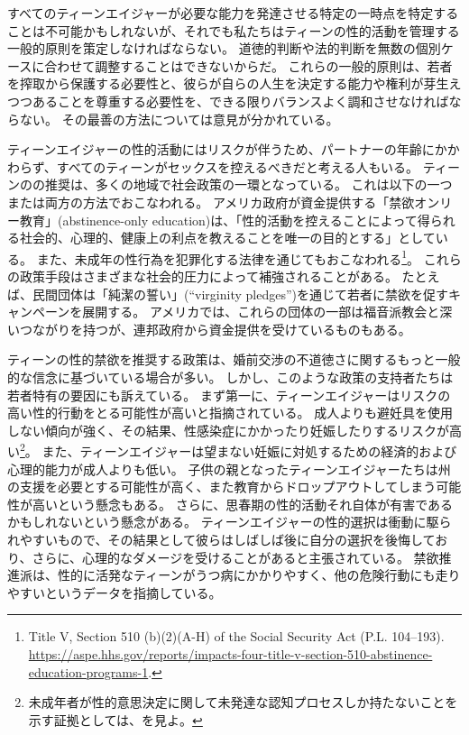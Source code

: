 \documentclass[paper=a4,book,openany]{jlreq}
\begin{document}
すべてのティーンエイジャーが必要な能力を発達させる特定の一時点を特定することは不可能かもしれないが、それでも私たちはティーンの性的活動を管理する一般的原則を策定しなければならない。
道徳的判断や法的判断を無数の個別ケースに合わせて調整することはできないからだ。
これらの一般的原則は、若者を搾取から保護する必要性と、彼らが自らの人生を決定する能力や権利が芽生えつつあることを尊重する必要性を、できる限りバランスよく調和させなければならない。
その最善の方法については意見が分かれている。

ティーンエイジャーの性的活動にはリスクが伴うため、パートナーの年齢にかかわらず、すべてのティーンがセックスを控えるべきだと考える人もいる。
ティーンのの推奨は、多くの地域で社会政策の一環となっている。
これは以下の一つまたは両方の方法でおこなわれる。
アメリカ政府が資金提供する「禁欲オンリー教育」(abstinence-only education)は、「性的活動を控えることによって得られる社会的、心理的、健康上の利点を教えることを唯一の目的とする」としている。
また、未成年の性行為を犯罪化する法律を通じてもおこなわれる\footnote{Title V, Section 510 (b)(2)(A-H) of the Social Security Act (P.L. 104--193). \url{https://aspe.hhs.gov/reports/impacts-four-title-v-section-510-abstinence-education-programs-1}.}。
これらの政策手段はさまざまな社会的圧力によって補強されることがある。
たとえば、民間団体は「純潔の誓い」(``virginity pledges'')を通じて若者に禁欲を促すキャンペーンを展開する。
アメリカでは、これらの団体の一部は福音派教会と深いつながりを持つが、連邦政府から資金提供を受けているものもある。

ティーンの性的禁欲を推奨する政策は、婚前交渉の不道徳さに関するもっと一般的な信念に基づいている場合が多い。
しかし、このような政策の支持者たちは若者特有の要因にも訴えている。
まず第一に、ティーンエイジャーはリスクの高い性的行動をとる可能性が高いと指摘されている。
成人よりも避妊具を使用しない傾向が強く、その結果、性感染症にかかったり妊娠したりするリスクが高い\footnote{未成年者が性的意思決定に関して未発達な認知プロセスしか持たないことを示す証拠としては、\citet{drobac14:_neurob_decis_makin_high_risk}を見よ。}。
また、ティーンエイジャーは望まない妊娠に対処するための経済的および心理的能力が成人よりも低い。
子供の親となったティーンエイジャーたちは州の支援を必要とする可能性が高く、また教育からドロップアウトしてしまう可能性が高いという懸念もある。
さらに、思春期の性的活動それ自体が有害であるかもしれないという懸念がある。
ティーンエイジャーの性的選択は衝動に駆られやすいもので、その結果として彼らはしばしば後に自分の選択を後悔しており、さらに、心理的なダメージを受けることがあると主張されている。
禁欲推進派は、性的に活発なティーンがうつ病にかかりやすく、他の危険行動にも走りやすいというデータを指摘している\citep[pp.163--170]{hallfors05:_which_comes_first_adoles}。
\end{document}
